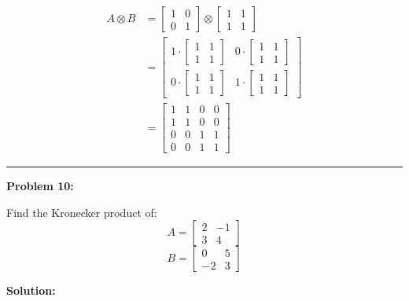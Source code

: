 \documentclass[
  letterpaper,
  DIV=11,
  numbers=noendperiod]{scrreprt}
\theoremstyle{plain}
\theoremstyle{definition}
\theoremstyle{remark}
\begin{document}
\begin{align*}
A \otimes B &= \begin{bmatrix}1&0\\0&1\end{bmatrix} \otimes \begin{bmatrix}1&1\\1&1\end{bmatrix} \\
&= \begin{bmatrix}
1 \cdot \begin{bmatrix}1&1\\1&1\end{bmatrix} & 0 \cdot \begin{bmatrix}1&1\\1&1\end{bmatrix} \\
0 \cdot \begin{bmatrix}1&1\\1&1\end{bmatrix} & 1 \cdot \begin{bmatrix}1&1\\1&1\end{bmatrix}
\end{bmatrix} \\
&= \begin{bmatrix}
1 & 1 & 0 & 0 \\
1 & 1 & 0 & 0 \\
0 & 0 & 1 & 1 \\
0 & 0 & 1 & 1
\end{bmatrix}
\end{align*}

\begin{center}\rule{0.5\linewidth}{0.5pt}\end{center}

\textbf{Problem 10:}

Find the Kronecker product of:
\[A=\begin{bmatrix}2&-1\\3&4\end{bmatrix}\]
\[B=\begin{bmatrix}0&5\\-2&3\end{bmatrix}\]

\textbf{Solution:}
\end{document}
